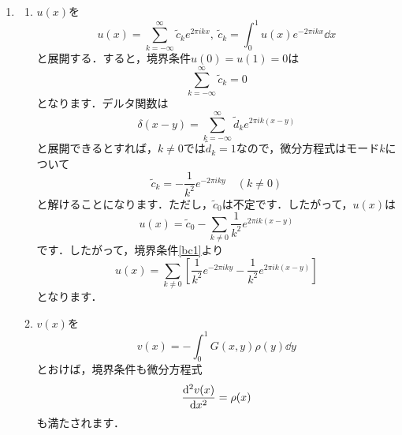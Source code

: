 \documentclass[a4paper,pdflatex,ja=standard]{bxjsarticle}
\begin{document}
\begin{enumerate}
  
  \item 

  \begin{enumerate}

    \item 

    $u(x)$を
    \begin{equation}
      u(x)
      =
      \sum_{k=-\infty}^{\infty}
      \tilde{c}_k e^{2\pi ikx}
      ,\ 
      \tilde{c}_k
      =
      \int_0^1
      u(x)e^{-2\pi ikx}
      \dd x
    \end{equation}
    と展開する．すると，境界条件$u(0)=u(1)=0$は
    \begin{equation}
      \sum_{k=-\infty}^{\infty}
      \tilde{c}_k
      =
      0
      \label{bc1}
    \end{equation}
    となります．デルタ関数は
    \begin{equation}
      \delta(x-y)
      =
      \sum_{k=-\infty}^{\infty}
      \tilde{d}_k e^{2\pi ik(x-y)}
    \end{equation}
    と展開できるとすれば，$k\neq 0$では$\tilde{d}_k=1$なので，微分方程式はモード$k$について
    \begin{equation}
      \tilde{c}_k
      =
      -\frac{1}{k^2}e^{-2\pi iky}
      \quad
      (k\neq 0)
    \end{equation}
    と解けることになります．ただし，$\tilde{c}_0$は不定です．したがって，$u(x)$は
    \begin{equation}
      u(x)
      =
      \tilde{c}_0
      -
      \sum_{k\neq 0}
      \frac{1}{k^2}
      e^{2\pi ik(x-y)}
    \end{equation}
    です．したがって，境界条件\eqref{bc1}より
    \begin{equation}
      u(x)
      =
      \sum_{k\neq 0}
      \left[
        \frac{1}{k^2}
        e^{-2\pi iky}
        -
        \frac{1}{k^2}
        e^{2\pi ik(x-y)}
      \right]
    \end{equation}
    となります．


    \item 

    $v(x)$を
    \begin{equation}
      v(x)
      =
      -\int_0^1
      G(x,y)\rho(y)
      \dd y
    \end{equation}
    とおけば，境界条件も微分方程式
    \begin{equation}
      \dv[2]{v(x)}{x}
      =
      \rho(x)
    \end{equation}
    も満たされます．


\end{enumerate}
\end{enumerate}
\end{document}
